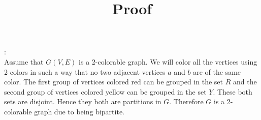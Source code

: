 \documentclass[a4paper]{exam}
\begin{document}
\begin{questions}
\begin{solution}
    \title{Proof}:
    \\
    Assume that $G(V,E)$ is a 2-colorable graph. We will color all the vertices using 2 colors in such a way that no two adjacent vertices $a$ and $b$ are of the same color. The first group of vertices colored red can be grouped in the set $R$ and the second group of vertices colored yellow can be grouped in the set $Y$. These both sets are disjoint. Hence they both are partitions in $G$. Therefore $G$
     is a 2-colorable graph due to being bipartite.
\end{solution}

 

\end{questions}
\end{document}

